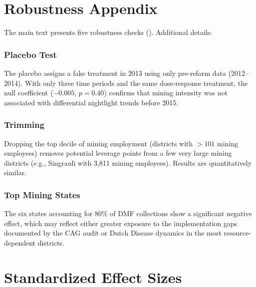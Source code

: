 \documentclass[12pt]{article}
\begin{document}
\section{Robustness Appendix}

The main text presents five robustness checks (). Additional details:

\subsubsection*{Placebo Test} The placebo assigns a fake treatment in 2013 using only pre-reform data (2012--2014). With only three time periods and the same dose-response treatment, the null coefficient ($-0.005$, $p = 0.40$) confirms that mining intensity was not associated with differential nightlight trends before 2015.

\subsubsection*{Trimming} Dropping the top decile of mining employment (districts with $> 101$ mining employees) removes potential leverage points from a few very large mining districts (e.g., Singrauli with 3,811 mining employees). Results are quantitatively similar.

\subsubsection*{Top Mining States} The six states accounting for 80\% of DMF collections show a significant negative effect, which may reflect either greater exposure to the implementation gaps documented by the CAG audit or Dutch Disease dynamics in the most resource-dependent districts.

\section{Standardized Effect Sizes}
\label{sec:sde}


\end{document}
